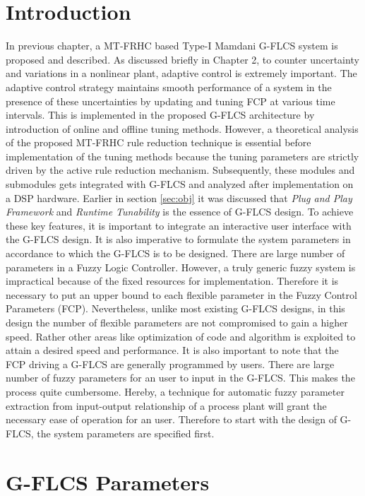 \section{Introduction}
In previous chapter, a MT\hyp{}FRHC based Type\hyp{}I Mamdani G\hyp{}FLCS system is proposed and described.  As discussed briefly in Chapter 2, to counter uncertainty and variations in a nonlinear plant, adaptive control is extremely important. The adaptive control strategy maintains smooth performance of a system in the presence of these uncertainties by updating and tuning FCP at various time intervals. This is implemented in the proposed G-FLCS architecture by introduction of online and offline tuning methods. However, a theoretical analysis of the proposed MT\hyp{}FRHC rule reduction technique is essential before implementation of the tuning methods because the tuning parameters are strictly driven by the active rule reduction mechanism. Subsequently, these modules and submodules gets integrated with G\hyp{}FLCS and analyzed after implementation on a DSP hardware. Earlier in section \ref{sec:obj} it was discussed that \textit{Plug and Play Framework} and \textit{Runtime Tunability} is the essence of G\hyp{}FLCS design. To achieve these key features, it is important to integrate an interactive user interface with the G\hyp{}FLCS design. It is also imperative to formulate the system parameters in accordance to which the G\hyp{}FLCS is to be designed. There are large number of parameters in a Fuzzy Logic Controller. However, a truly generic fuzzy system is impractical because of the fixed resources for implementation. Therefore it is necessary to put an upper bound to each flexible parameter in the Fuzzy Control Parameters (FCP). Nevertheless, unlike most existing G\hyp{}FLCS designs, in this design the number of flexible parameters are not compromised to gain a higher speed. Rather other areas like optimization of code and algorithm is exploited to attain a desired speed and performance. It is also important to note that the FCP driving a G\hyp{}FLCS are generally programmed by users. There are large number of fuzzy parameters for an user to input in the G\hyp{}FLCS. This makes the process quite cumbersome. Hereby, a technique for automatic fuzzy parameter extraction from input\hyp{}output relationship of a process plant will grant the necessary ease of operation for an user. Therefore to start with the design of G\hyp{}FLCS, the system parameters are specified first. 

\section{G\hyp{}FLCS Parameters} \label{sec:des_op}

